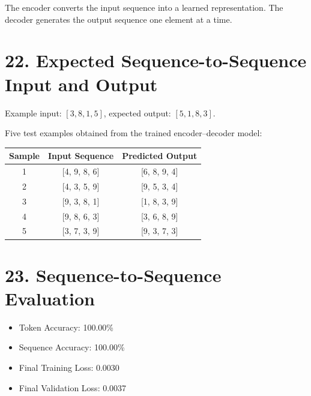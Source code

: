 \documentclass[10pt]{article}
\begin{document}
\begin{center}
\end{center}

The encoder converts the input sequence into a learned representation.
The decoder generates the output sequence one element at a time.

\section*{22. Expected Sequence-to-Sequence Input and Output}

Example input: $[3,8,1,5]$, expected output: $[5,1,8,3]$.

Five test examples obtained from the trained encoder--decoder model:

\begin{center}
\begin{tabular}{|c|c|c|}
\hline
Sample & Input Sequence & Predicted Output\\
\hline
1 & [4, 9, 8, 6] & [6, 8, 9, 4]\\
2 & [4, 3, 5, 9] & [9, 5, 3, 4]\\
3 & [9, 3, 8, 1] & [1, 8, 3, 9]\\
4 & [9, 8, 6, 3] & [3, 6, 8, 9]\\
5 & [3, 7, 3, 9] & [9, 3, 7, 3]\\
\hline
\end{tabular}
\end{center}

\section*{23. Sequence-to-Sequence Evaluation}

\begin{itemize}
\item Token Accuracy: 100.00\%
\item Sequence Accuracy: 100.00\%
\item Final Training Loss: 0.0030
\item Final Validation Loss: 0.0037
\end{itemize}
\end{document}
